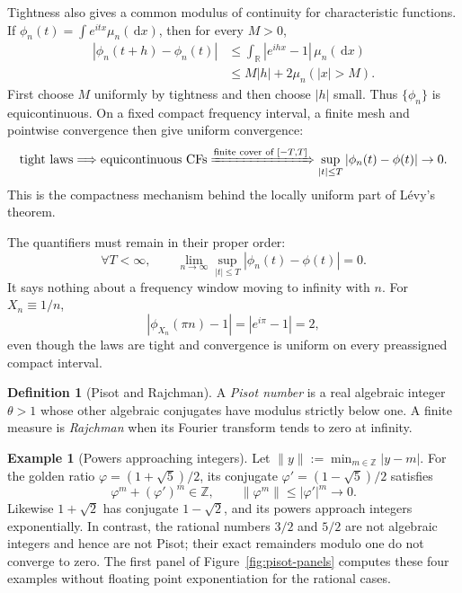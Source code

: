 \documentclass[10pt,a4paper]{article}
\numberwithin{equation}{section}
\theoremstyle{blueplain}
\theoremstyle{definition}
\newtheorem{definition}[theorem]{Definition}
\newtheorem{example}[theorem]{Example}
\newcommand{\R}{\mathbb R}
\newcommand{\dd}{\,\mathrm d}
\begin{document}
Tightness also gives a common modulus of continuity for characteristic
functions.  If
\(\phi_n(t)=\int e^{itx}\mu_n(\dd x)\), then for every \(M>0\),
\begin{align}
  |\phi_n(t+h)-\phi_n(t)|
  &\le\int_{\R}|e^{ihx}-1|\,\mu_n(\dd x)\\
  &\le M|h|+2\mu_n(|x|>M).
  \label{eq:tightness-equicontinuity}
\end{align}
First choose \(M\) uniformly by tightness and then choose \(|h|\) small.  Thus
\(\{\phi_n\}\) is equicontinuous.  On a fixed compact frequency interval, a
finite mesh and pointwise convergence then give uniform convergence:
\begin{equation}
  \text{tight laws}
  \Longrightarrow
  \text{equicontinuous CFs}
  \xRightarrow{\text{finite cover of }[-T,T]}
  \sup_{|t|\le T}|\phi_n(t)-\phi(t)|\to0.
  \label{eq:tightness-local-uniform-chain}
\end{equation}
This is the compactness mechanism behind the locally uniform part of
L\'evy's theorem.

The quantifiers must remain in their proper order:
\[
  \forall T<\infty,\qquad
  \lim_{n\to\infty}\sup_{|t|\le T}
  |\phi_n(t)-\phi(t)|=0.
\]
It says nothing about a frequency window moving to infinity with \(n\).  For
\(X_n\equiv1/n\),
\[
  |\phi_{X_n}(\pi n)-1|
  =|e^{i\pi}-1|=2,
\]
even though the laws are tight and convergence is uniform on every
preassigned compact interval.

\begin{definition}[Pisot and Rajchman]
A \emph{Pisot number} is a real algebraic integer \(\theta>1\) whose other
algebraic conjugates have modulus strictly below one.  A finite measure is
\emph{Rajchman} when its Fourier transform tends to zero at infinity.
\end{definition}

\begin{example}[Powers approaching integers]
Let \(\|y\|:=\min_{m\in\mathbb Z}|y-m|\).  For the golden ratio
\(\varphi=(1+\sqrt5)/2\), its conjugate
\(\varphi'=(1-\sqrt5)/2\) satisfies
\[
  \varphi^m+(\varphi')^m\in\mathbb Z,
  \qquad
  \|\varphi^m\|\le|\varphi'|^m\longrightarrow0.
\]
Likewise \(1+\sqrt2\) has conjugate \(1-\sqrt2\), and its powers approach
integers exponentially.  In contrast, the rational numbers \(3/2\) and
\(5/2\) are not algebraic integers and hence are not Pisot; their exact
remainders modulo one do not converge to zero.  The first panel of
Figure~\ref{fig:pisot-panels} computes these four examples without floating
point exponentiation for the rational cases.
\end{example}
\end{document}
